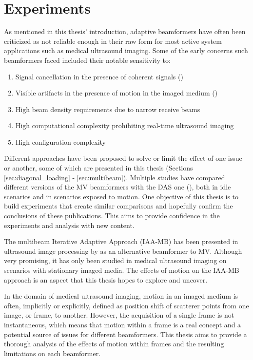 \chapter{Experiments}
\label{chap:experiments}

As mentioned in this thesis' introduction, adaptive beamformers have often been criticized as not reliable enough in their raw form for most active system applications such as medical ultrasound imaging.
Some of the early concerns such beamformers faced included their notable sensitivity to:
\begin{enumerate}
    \item Signal cancellation in the presence of coherent signals (\cite{spatial_smoothing})
    \item Visible artifacts in the presence of motion in the imaged medium (\cite{Asen_shift_invariance})
    \item High beam density requirements due to narrow receive beams
    \item High computational complexity prohibiting real-time ultrasound imaging
    \item High configuration complexity
\end{enumerate}
\noindent
Different approaches have been proposed to solve or limit the effect of one issue or another, some of which are presented in this thesis (Sections \ref{sec:diagonal_loading} - \ref{sec:multibeam}).
Multiple studies have compared different versions of the MV beamformers with the DAS one (\cite{Synnevag_Benefits, Synnevag_adaptive, Asen_shift_invariance}), both in idle scenarios and in scenarios exposed to motion. One objective of this thesis is to build experiments that create similar comparisons and hopefully confirm the conclusions of these publications. This aims to provide confidence in the experiments and analysis with new content.

The multibeam Iterative Adaptive Approach (IAA-MB) has been presented in ultrasound image processing by \cite{Jensen_IAA} as an alternative beamformer to MV. Although very promising, it has only been studied in medical ultrasound imaging on scenarios with stationary imaged media. The effects of motion on the IAA-MB approach is an aspect that this thesis hopes to explore and uncover.

In the domain of medical ultrasound imaging, motion in an imaged medium is often, implicitly or explicitly, defined as position shift of scatterer points from one image, or frame, to another. However, the acquisition of a single frame is not instantaneous, which means that motion within a frame is a real concept and a potential source of issues for different beamformers. This thesis aims to provide a thorough analysis of the effects of motion within frames and the resulting limitations on each beamformer.

